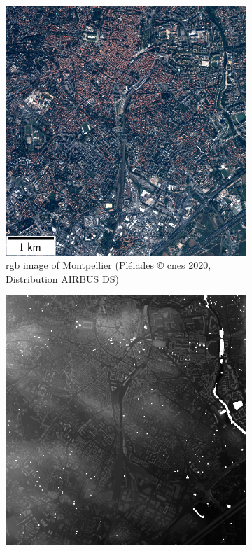 \begin{figure}
    \centering
    \begin{subfigure}[t]{0.48\linewidth}
        \flushleft
        \includegraphics[width=\linewidth]{Images/Chap_6/miniature_Montpellier.png}
        \caption{\acrshort{rgb} image of Montpellier (Pléiades © \acrshort{cnes} 2020, Distribution AIRBUS DS)}
        \label{fig:miniature_Montpellier_rgb}
    \end{subfigure}\hfill
    \begin{subfigure}[t]{0.48\linewidth}
        \flushright
        \includegraphics[width=\linewidth]{Images/Chap_6/miniature_Montpellier_gt.png}

\end{subfigure}
\end{figure}

